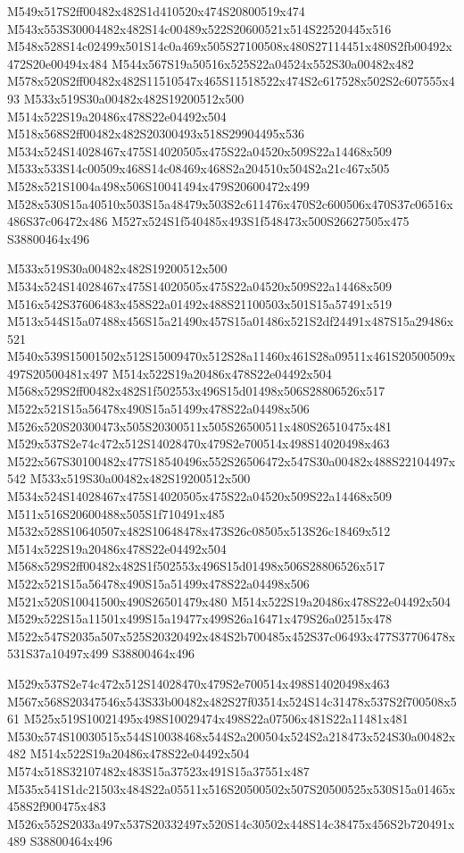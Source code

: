 \documentclass{article}
\begin{document}
\begin{multicols}{2}
M549x517S2ff00482x482S1d410520x474S20800519x474 M543x553S30004482x482S14c00489x522S20600521x514S22520445x516 M548x528S14c02499x501S14c0a469x505S27100508x480S27114451x480S2fb00492x472S20e00494x484 M544x567S19a50516x525S22a04524x552S30a00482x482 M578x520S2ff00482x482S11510547x465S11518522x474S2c617528x502S2c607555x493 M533x519S30a00482x482S19200512x500 M514x522S19a20486x478S22e04492x504 M518x568S2ff00482x482S20300493x518S29904495x536 M534x524S14028467x475S14020505x475S22a04520x509S22a14468x509 M533x533S14c00509x468S14c08469x468S2a204510x504S2a21c467x505 M528x521S1004a498x506S10041494x479S20600472x499 M528x530S15a40510x503S15a48479x503S2c611476x470S2c600506x470S37c06516x486S37c06472x486 M527x524S1f540485x493S1f548473x500S26627505x475 S38800464x496

M533x519S30a00482x482S19200512x500 M534x524S14028467x475S14020505x475S22a04520x509S22a14468x509 M516x542S37606483x458S22a01492x488S21100503x501S15a57491x519 M513x544S15a07488x456S15a21490x457S15a01486x521S2df24491x487S15a29486x521 M540x539S15001502x512S15009470x512S28a11460x461S28a09511x461S20500509x497S20500481x497 M514x522S19a20486x478S22e04492x504 M568x529S2ff00482x482S1f502553x496S15d01498x506S28806526x517 M522x521S15a56478x490S15a51499x478S22a04498x506 M526x520S20300473x505S20300511x505S26500511x480S26510475x481 M529x537S2e74c472x512S14028470x479S2e700514x498S14020498x463 M522x567S30100482x477S18540496x552S26506472x547S30a00482x488S22104497x542 M533x519S30a00482x482S19200512x500 M534x524S14028467x475S14020505x475S22a04520x509S22a14468x509 M511x516S20600488x505S1f710491x485 M532x528S10640507x482S10648478x473S26c08505x513S26c18469x512 M514x522S19a20486x478S22e04492x504 M568x529S2ff00482x482S1f502553x496S15d01498x506S28806526x517 M522x521S15a56478x490S15a51499x478S22a04498x506 M521x520S10041500x490S26501479x480 M514x522S19a20486x478S22e04492x504 M529x522S15a11501x499S15a19477x499S26a16471x479S26a02515x478 M522x547S2035a507x525S20320492x484S2b700485x452S37c06493x477S37706478x531S37a10497x499 S38800464x496

M529x537S2e74c472x512S14028470x479S2e700514x498S14020498x463 M567x568S20347546x543S33b00482x482S27f03514x524S14c31478x537S2f700508x561 M525x519S10021495x498S10029474x498S22a07506x481S22a11481x481 M530x574S10030515x544S10038468x544S2a200504x524S2a218473x524S30a00482x482 M514x522S19a20486x478S22e04492x504 M574x518S32107482x483S15a37523x491S15a37551x487 M535x541S1dc21503x484S22a05511x516S20500502x507S20500525x530S15a01465x458S2f900475x483 M526x552S2033a497x537S20332497x520S14c30502x448S14c38475x456S2b720491x489 S38800464x496


\end{multicols}
\end{document}
